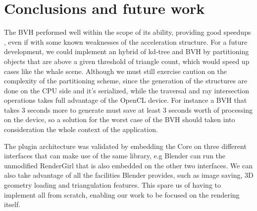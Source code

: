 \documentclass{vgtc}
\begin{document}
\section{Conclusions and future work}
\label{sec:conclusion}

The BVH performed well within the scope of its ability, providing good
speedups , even if with some known weaknesses of the acceleration
structure. For a future development, we could implement an hybrid of
kd-tree and BVH by partitioning objects that are above a given
threshold of triangle count, which would speed up cases like the whale
scene. Although we must still exercise caution on the complexity of
the partitioning scheme, since the generation of the structures are
done on the CPU side and it's serialized, while the traversal and ray
intersection operations takes full advantage of the OpenCL device. For
instance a BVH that takes 3 seconds more to generate must save at
least 3 seconds worth of processing on the device, so a solution for
the worst case of the BVH should taken into consideration the whole
context of the application.

The plugin architecture was validated by embedding the Core on three
different interfaces that can make use of the same library, e.g
Blender can run the unmodified RenderGirl that is also embedded on the
other two interfaces. We can also take advantage of all the facilities
Blender provides, such as image saving, 3D geometry loading and
triangulation features. This spare us of having to implement all from
scratch, enabling our work to be focused on the rendering
itself.





\end{document}
